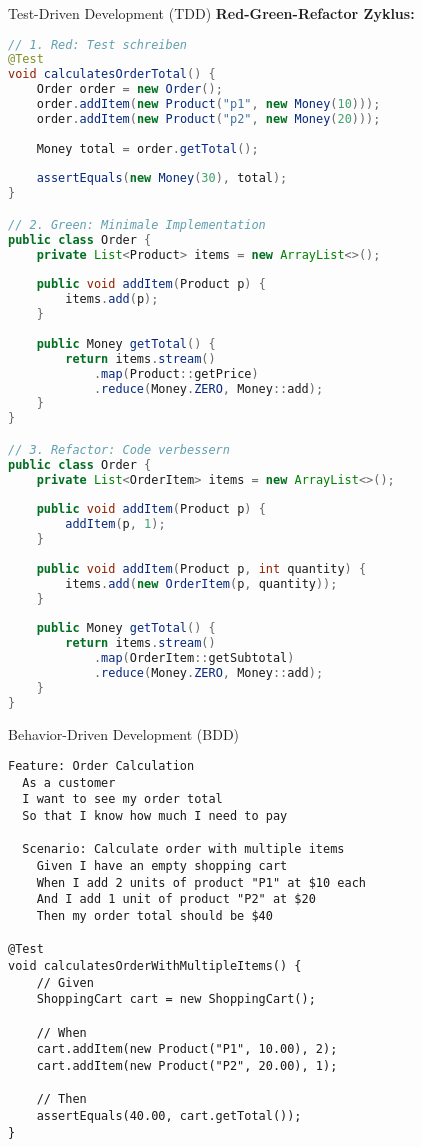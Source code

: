 \begin{KR}{Test-Driven Development (TDD)}
\textbf{Red-Green-Refactor Zyklus:}
\begin{lstlisting}[language=Java]
// 1. Red: Test schreiben
@Test
void calculatesOrderTotal() {
    Order order = new Order();
    order.addItem(new Product("p1", new Money(10)));
    order.addItem(new Product("p2", new Money(20)));
    
    Money total = order.getTotal();
    
    assertEquals(new Money(30), total);
}

// 2. Green: Minimale Implementation
public class Order {
    private List<Product> items = new ArrayList<>();
    
    public void addItem(Product p) {
        items.add(p);
    }
    
    public Money getTotal() {
        return items.stream()
            .map(Product::getPrice)
            .reduce(Money.ZERO, Money::add);
    }
}

// 3. Refactor: Code verbessern
public class Order {
    private List<OrderItem> items = new ArrayList<>();
    
    public void addItem(Product p) {
        addItem(p, 1);
    }
    
    public void addItem(Product p, int quantity) {
        items.add(new OrderItem(p, quantity));
    }
    
    public Money getTotal() {
        return items.stream()
            .map(OrderItem::getSubtotal)
            .reduce(Money.ZERO, Money::add);
    }
}
\end{lstlisting}
\end{KR}

\begin{example}{Behavior-Driven Development (BDD)}
\begin{lstlisting}[language=gherkin]
Feature: Order Calculation
  As a customer
  I want to see my order total
  So that I know how much I need to pay

  Scenario: Calculate order with multiple items
    Given I have an empty shopping cart
    When I add 2 units of product "P1" at $10 each
    And I add 1 unit of product "P2" at $20
    Then my order total should be $40

@Test
void calculatesOrderWithMultipleItems() {
    // Given
    ShoppingCart cart = new ShoppingCart();
    
    // When
    cart.addItem(new Product("P1", 10.00), 2);
    cart.addItem(new Product("P2", 20.00), 1);
    
    // Then
    assertEquals(40.00, cart.getTotal());
}
\end{lstlisting}
\end{example}

